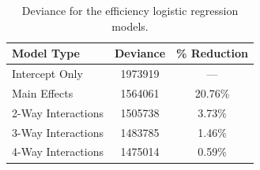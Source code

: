 \documentclass[12pt]{article}
\begin{document}
\clearpage
\begin{table}[ht]
	\centering
	\begin{tabular}{lcc}
  		\hline
		Model Type & Deviance & \% Reduction\\
		\hline
		Intercept Only & 1973919 & ---\\ 
  		Main Effects & 1564061 & 20.76\%\\ 
  		2-Way Interactions & 1505738 & 3.73\%\\ 
  		3-Way Interactions & 1483785 & 1.46\% \\ 
  		4-Way Interactions & 1475014 & 0.59\% \\ 
   		\hline
	\end{tabular}
	\caption{Deviance for the efficiency logistic regression models.}
	\label{tab:homOrdDev}
\end{table}
\end{document}
